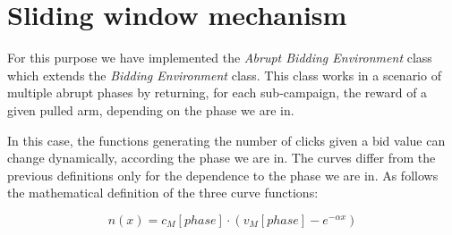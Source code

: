 \section{Sliding window mechanism}
For this purpose we have implemented the \textit{Abrupt Bidding Environment} class which extends the \textit{Bidding Environment} class. This class works in a scenario of multiple abrupt phases by returning, for each sub-campaign, the reward of a given pulled arm, depending on the phase we are in.

In this case, the functions generating the number of clicks given a bid value can change dynamically, according the phase we are in.
The curves differ from the previous definitions only for the dependence to the phase we are in. As follows the mathematical definition of the three curve functions:

\begin{equation}
    n(x) = c_{M}[phase] \cdot (v_{M}[phase] - e^{-\alpha x})
\end{equation}

